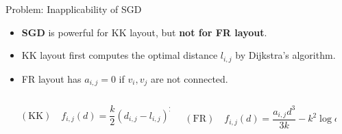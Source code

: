 \documentclass[13pt,aspectratio=169,table,dvipdfmx]{beamer}
\newif\ifShowHidden
\begin{document}
\ifShowHidden
    \begin{frame}{Problem: Inapplicability of SGD}
        \begin{itemize}
            \item \textbf{SGD} is powerful for KK layout, but \textbf{not for FR layout}.
            \item KK layout first computes the optimal distance $l_{i,j}$ by Dijkstra's algorithm.
            \item FR layout has $a_{i,j}=0$ if $v_i,v_j$ are not connected.
        \end{itemize}
        \begin{columns}
            \begin{column}{0.1\columnwidth}\end{column}
            \begin{column}{0.4\columnwidth}
                \begin{equation*}
                    \mathrm{(KK)} \quad  f_{i,j}(d) = \frac{k}{2} (d_{i,j} - l_{i,j})^2
                \end{equation*}
            \end{column}
            \begin{column}{0.4\columnwidth}
                \begin{equation*}
                    \mathrm{(FR)} \quad  f_{i,j}(d) = \frac{a_{i,j} d^3}{3k} - k^2\log{d}
                \end{equation*}
            \end{column}
            \begin{column}{0.1\columnwidth}\end{column}
        \end{columns}
        \begin{figure}[htbp]
            \centering
\end{figure}
\end{frame}
\end{document}
